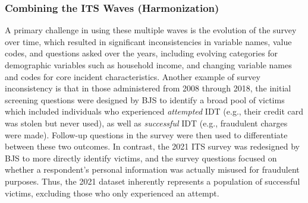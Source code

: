 \subsubsection{Combining the ITS Waves (Harmonization)}
A primary challenge in using these multiple waves is the evolution of the survey over time, which resulted in significant inconsistencies in variable names, value codes, and questions asked over the years, including evolving categories for demographic variables such as household income, and changing variable names and codes for core incident characteristics. Another example of survey inconsistency is that in those administered from 2008 through 2018, the initial screening questions were designed by BJS to identify a broad pool of victims which included individuals who experienced \textit{attempted} IDT (e.g., their credit card was stolen but never used), as well as \textit{successful} IDT (e.g., fraudulent charges were made). Follow-up questions in the survey were then used to differentiate between these two outcomes. In contrast, the 2021 ITS survey was redesigned by BJS to more directly identify victims, and the survey questions focused on whether a respondent's personal information was actually misused for fraudulent purposes. Thus, the 2021 dataset inherently represents a population of successful victims, excluding those who only experienced an attempt.


